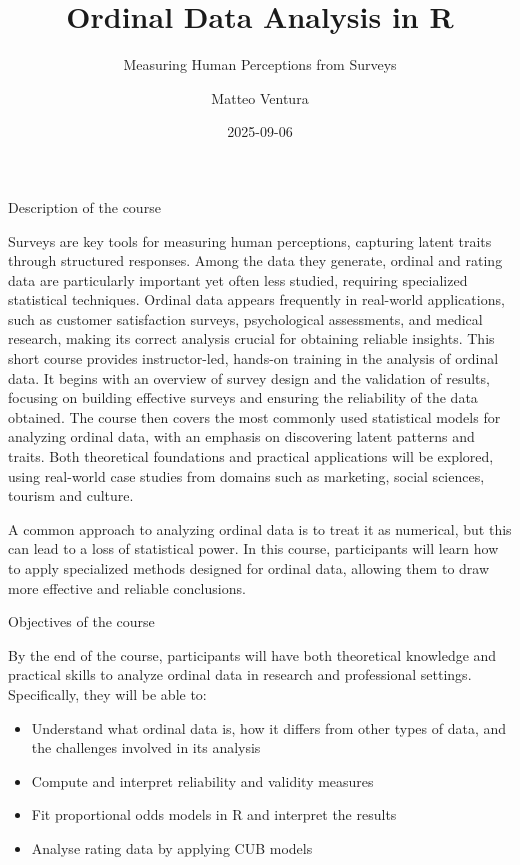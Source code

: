 \documentclass[
  letterpaper,
  DIV=11,
  numbers=noendperiod]{scrartcl}
\title{Ordinal Data Analysis in R}
\subtitle{Measuring Human Perceptions from Surveys}
\author{Matteo Ventura}
\date{2025-09-06}
\providecommand{\tightlist}{%
  \setlength{\itemsep}{0pt}\setlength{\parskip}{0pt}}\usepackage{longtable,booktabs,array}
\begin{document}
\maketitle
\ifdefined\Shaded\renewenvironment{Shaded}{\begin{tcolorbox}[boxrule=0pt, breakable, sharp corners, borderline west={3pt}{0pt}{shadecolor}, interior hidden, enhanced, frame hidden]}{\end{tcolorbox}}\fi

Description of the course

Surveys are key tools for measuring human perceptions, capturing latent
traits through structured responses. Among the data they generate,
ordinal and rating data are particularly important yet often less
studied, requiring specialized statistical techniques. Ordinal data
appears frequently in real-world applications, such as customer
satisfaction surveys, psychological assessments, and medical research,
making its correct analysis crucial for obtaining reliable insights.
This short course provides instructor-led, hands-on training in the
analysis of ordinal data. It begins with an overview of survey design
and the validation of results, focusing on building effective surveys
and ensuring the reliability of the data obtained. The course then
covers the most commonly used statistical models for analyzing ordinal
data, with an emphasis on discovering latent patterns and traits. Both
theoretical foundations and practical applications will be explored,
using real-world case studies from domains such as marketing, social
sciences, tourism and culture.

A common approach to analyzing ordinal data is to treat it as numerical,
but this can lead to a loss of statistical power. In this course,
participants will learn how to apply specialized methods designed for
ordinal data, allowing them to draw more effective and reliable
conclusions.

Objectives of the course

By the end of the course, participants will have both theoretical
knowledge and practical skills to analyze ordinal data in research and
professional settings. Specifically, they will be able to:

\begin{itemize}
\tightlist
\item
  Understand what ordinal data is, how it differs from other types of
  data, and the challenges involved in its analysis
\item
  Compute and interpret reliability and validity measures
\item
  Fit proportional odds models in R and interpret the results
\item
  Analyse rating data by applying CUB models
\end{itemize}
\end{document}
